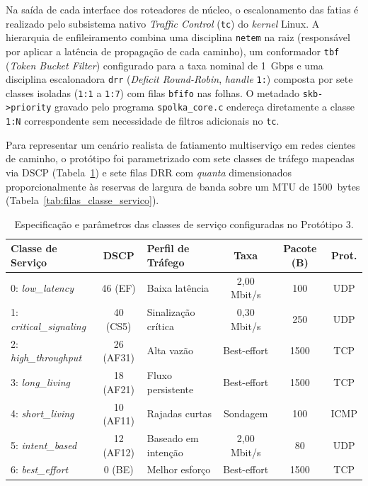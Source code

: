 Na saída de cada interface dos roteadores de núcleo, o escalonamento das fatias é realizado pelo subsistema nativo \textit{Traffic Control} (\texttt{tc}) do \textit{kernel} Linux. A hierarquia de enfileiramento combina uma disciplina \texttt{netem} na raiz (responsável por aplicar a latência de propagação de cada caminho), um conformador \texttt{tbf} (\textit{Token Bucket Filter}) configurado para a taxa nominal de 1~Gbps e uma disciplina escalonadora \texttt{drr} (\textit{Deficit Round-Robin}, \textit{handle} \texttt{1:}) composta por sete classes isoladas (\texttt{1:1} a \texttt{1:7}) com filas \texttt{bfifo} nas folhas. O metadado \texttt{skb->priority} gravado pelo programa \texttt{spolka\_core.c} endereça diretamente a classe \texttt{1:N} correspondente sem necessidade de filtros adicionais no \texttt{tc}.

Para representar um cenário realista de fatiamento multiserviço em redes cientes de caminho, o protótipo foi parametrizado com sete classes de tráfego mapeadas via DSCP (Tabela~\ref{tab:classes_servico}) e sete filas DRR com \textit{quanta} dimensionados proporcionalmente às reservas de largura de banda sobre um MTU de 1500~bytes (Tabela~\ref{tab:filas_classe_servico}).

\begin{table}[htbp]
    \centering
    \caption{Especificação e parâmetros das classes de serviço configuradas no Protótipo 3.}
    \label{tab:classes_servico}
    \begin{tabularx}{\textwidth}{lcXccc}
        \toprule
        \textbf{Classe de Serviço} & \textbf{DSCP} & \textbf{Perfil de Tráfego} & \textbf{Taxa} & \textbf{Pacote (B)} & \textbf{Prot.} \\
        \midrule
        0: \textit{low\_latency}        & 46 (EF)   & Baixa latência     & 2,00 Mbit/s & 100  & UDP \\
        1: \textit{critical\_signaling} & 40 (CS5)  & Sinalização crítica & 0,30 Mbit/s & 250  & UDP \\
        2: \textit{high\_throughput}    & 26 (AF31) & Alta vazão         & Best-effort & 1500 & TCP \\
        3: \textit{long\_living}        & 18 (AF21) & Fluxo persistente  & Best-effort & 1500 & TCP \\
        4: \textit{short\_living}       & 10 (AF11) & Rajadas curtas     & Sondagem    & 100  & ICMP \\
        5: \textit{intent\_based}       & 12 (AF12) & Baseado em intenção & 2,00 Mbit/s & 80   & UDP \\
        6: \textit{best\_effort}        & 0 (BE)    & Melhor esforço     & Best-effort & 1500 & TCP \\
        \bottomrule
    \end{tabularx}
\end{table}

